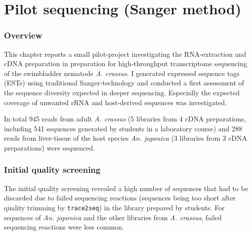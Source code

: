 
\chapter{Pilot sequencing (Sanger method)} %
\label{pilot-seq}


\ifpdf
    \graphicspath{{3_pilot/figures/PNG/}{3_pilot/figures/PDF/}{3_pilot/figures/}}
\else
    \graphicspath{{3_pilot/figures/EPS/}{3_pilot/figures/}}
\fi


\subsection{Overview}

This chapter reports a small pilot-project investigating the
RNA-extraction and cDNA preparation in preparation for high-throughput
transcriptome sequencing of the swimbladder nematode
\textit{A. crassus}. I generated expressed sequence tags (ESTs) using
traditional Sanger-technology and conducted a first assessment of the
sequence diversity expected in deeper sequencing. Especially the
expected coverage of unwanted rRNA and host-derived sequences was
investigated.

In total 945 reads from adult \textit{A. crassus} (5 libraries from 4
cDNA preparations, including 541 sequences generated by students in a
laboratory course) and 288 reads from liver-tissue of the host species
\textit{An. japonica} (3 libraries from 3 cDNA preparations) were
sequenced.

\subsection{Initial quality screening}
\label{qual-pil}

The initial quality screening revealed a high number of sequences that
had to be discarded due to failed sequencing reactions (sequences
being too short after quality trimming by \texttt{trace2seq}) in the
library prepared by students. For sequences of \textit{An. japonica}
and the other libraries from \textit{A. crassus}, failed sequencing
reactions were less common.


